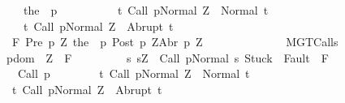 \begin{isabellebody}
\ \ \ \ \ \ \ \ \ \ {\isacharparenleft}the\ {\isacharparenleft}{\isasymGamma}\ p{\isacharparenright}{\isacharparenright}\isanewline
\ \ \ \ \ \ \ \ \ \ {\isacharbraceleft}t{\isachardot}\ {\isasymGamma}{\isasymturnstile}{\isasymlangle}Call\ p{\isacharcomma}Normal\ Z{\isasymrangle}\ {\isasymRightarrow}\ Normal\ t{\isacharbraceright}{\isacharcomma}\isanewline
\ \ \ \ \ \ \ \ \ \ {\isacharbraceleft}t{\isachardot}\ {\isasymGamma}{\isasymturnstile}{\isasymlangle}Call\ p{\isacharcomma}Normal\ Z{\isasymrangle}\ {\isasymRightarrow}\ Abrupt\ t{\isacharbraceright}{\isachardoublequoteclose}\isanewline
\ \ \ \ \ \ {\isacharparenleft}\ {\isachardoublequoteopen}{\isasymGamma}{\isacharcomma}{\isacharquery}{\isasymTheta}\ {\isasymturnstile}\isactrlbsub {\isacharslash}F\isactrlesub \ {\isacharparenleft}{\isacharquery}Pre\ p\ Z{\isacharparenright}\ {\isacharparenleft}the\ {\isacharparenleft}{\isasymGamma}\ p{\isacharparenright}{\isacharparenright}\ {\isacharparenleft}{\isacharquery}Post\ p\ Z{\isacharparenright}{\isacharcomma}{\isacharparenleft}{\isacharquery}Abr\ p\ Z{\isacharparenright}{\isachardoublequoteclose}{\isacharparenright}\isanewline
\ \ \ \ \isamarkupfalse%
\ {\isacharminus}\isanewline
\ \ \ \ \ \ \isamarkupfalse%
\ MGT{\isacharunderscore}Calls{\isacharcolon}\isanewline
\ \ \ \ \ \ \ {\isachardoublequoteopen}{\isasymforall}p{\isasymin}dom\ {\isasymGamma}{\isachardot}\ {\isasymforall}Z{\isachardot}\ {\isasymGamma}{\isacharcomma}{\isacharquery}{\isasymTheta}\ {\isasymturnstile}\isactrlbsub {\isacharslash}F\isactrlesub \ \isanewline
\ \ \ \ \ \ \ \ {\isacharbraceleft}s{\isachardot}\ s{\isacharequal}Z\ {\isasymand}\ {\isasymGamma}{\isasymturnstile}{\isasymlangle}Call\ p{\isacharcomma}Normal\ s{\isasymrangle}\ {\isasymRightarrow}{\isasymnotin}{\isacharparenleft}{\isacharbraceleft}Stuck{\isacharbraceright}\ {\isasymunion}\ Fault\ {\isacharbackquote}\ {\isacharparenleft}{\isacharminus}F{\isacharparenright}{\isacharparenright}{\isacharbraceright}\isanewline
\ \ \ \ \ \ \ \ \ {\isacharparenleft}Call\ p{\isacharparenright}\isanewline
\ \ \ \ \ \ \ \ {\isacharbraceleft}t{\isachardot}\ {\isasymGamma}{\isasymturnstile}{\isasymlangle}Call\ p{\isacharcomma}Normal\ Z{\isasymrangle}\ {\isasymRightarrow}\ Normal\ t{\isacharbraceright}{\isacharcomma}\isanewline
\ \ \ \ \ \ \ \ {\isacharbraceleft}t{\isachardot}\ {\isasymGamma}{\isasymturnstile}{\isasymlangle}Call\ p{\isacharcomma}Normal\ Z{\isasymrangle}\ {\isasymRightarrow}\ Abrupt\ t{\isacharbraceright}{\isachardoublequoteclose}\isanewline
\ \ \ \ \ \ \ \ \isamarkupfalse%

\end{isabellebody}
